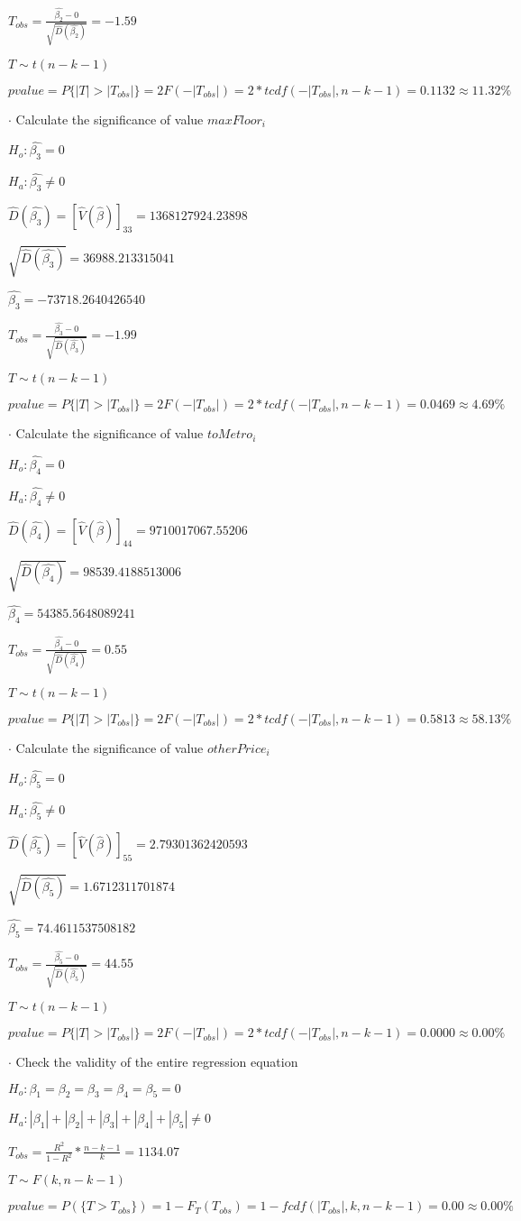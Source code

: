\documentclass{article}
\begin{document}
$T_{obs}=\frac{\hat{\beta_2}-0}{\sqrt{\hat{D}(\hat{\beta_2})}}=-1.59$

$T\sim t(n-k-1)$

$pvalue=P\{|T|>|T_{obs}|\}=2F(-|T_{obs}|)=2*tcdf(-|T_{obs}|, n-k-1)=0.1132\approx11.32\%$

$\cdot$ Calculate the significance of value $maxFloor_i$

$H_o: \hat{\beta_3}=0$

$H_a: \hat{\beta_3}\neq0$

$\hat{D}(\hat{\beta_3})=[\hat{V}(\hat{\beta})]_{3 3}=1368127924.23898$

$\sqrt{\hat{D}(\hat{\beta_3})}=36988.213315041$

$\hat{\beta_3}=-73718.2640426540$

$T_{obs}=\frac{\hat{\beta_3}-0}{\sqrt{\hat{D}(\hat{\beta_3})}}=-1.99$

$T\sim t(n-k-1)$

$pvalue=P\{|T|>|T_{obs}|\}=2F(-|T_{obs}|)=2*tcdf(-|T_{obs}|, n-k-1)=0.0469\approx4.69\%$

$\cdot$ Calculate the significance of value $toMetro_i$

$H_o: \hat{\beta_4}=0$

$H_a: \hat{\beta_4}\neq0$

$\hat{D}(\hat{\beta_4})=[\hat{V}(\hat{\beta})]_{4 4}=9710017067.55206$

$\sqrt{\hat{D}(\hat{\beta_4})}=98539.4188513006$

$\hat{\beta_4}=54385.5648089241$

$T_{obs}=\frac{\hat{\beta_4}-0}{\sqrt{\hat{D}(\hat{\beta_4})}}=0.55$

$T\sim t(n-k-1)$

$pvalue=P\{|T|>|T_{obs}|\}=2F(-|T_{obs}|)=2*tcdf(-|T_{obs}|, n-k-1)=0.5813\approx58.13\%$

$\cdot$ Calculate the significance of value $otherPrice_i$

$H_o: \hat{\beta_5}=0$

$H_a: \hat{\beta_5}\neq0$

$\hat{D}(\hat{\beta_5})=[\hat{V}(\hat{\beta})]_{5 5}=2.79301362420593$

$\sqrt{\hat{D}(\hat{\beta_5})}=1.6712311701874$

$\hat{\beta_5}=74.4611537508182$

$T_{obs}=\frac{\hat{\beta_5}-0}{\sqrt{\hat{D}(\hat{\beta_5})}}=44.55$

$T\sim t(n-k-1)$

$pvalue=P\{|T|>|T_{obs}|\}=2F(-|T_{obs}|)=2*tcdf(-|T_{obs}|, n-k-1)=0.0000\approx0.00\%$

$\cdot$ Check the validity of the entire regression equation

$H_o: \beta_1=\beta_2=\beta_3=\beta_4=\beta_5=0$

$H_a: |\beta_1|+|\beta_2|+|\beta_3|+|\beta_4|+|\beta_5|\neq0$

$T_{obs}=\frac{R^2}{1-R^2}*\frac{n-k-1}{k}=1134.07$

$T\sim F(k,n-k-1)$

$pvalue=P(\{T>T_{obs}\})=1-F_T(T_{obs})=1-fcdf(|T_{obs}|,k,n-k-1)=0.00\approx0.00\%$
\end{document}
